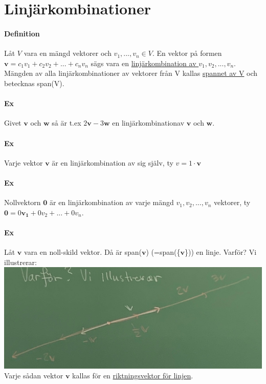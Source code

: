 \section{Linjärkombinationer}
\paragraph{Definition} Låt $V$ vara en mängd vektorer och $v_{1}, ... ,v_{n}\in V$.
En vektor på formen $\bm{v} = c_{1}v_{1}+c_{2}v_{2}+ ... + c_{n}v_{n}$ sägs vara en
\underline{linjärkombination av $v_{1}, v_{2}, ... , v_{n}$}.
Mängden av alla linjärkombinationer av vektorer från V kallas \underline{spannet av V}
och betecknas span(V).

\paragraph{Ex} Givet $\bm{v}$ och $\bm{w}$ så är t.ex $2\bm{v}-3\bm{w}$ en linjärkombinationav $\bm{v}$ och $\bm{w}$.

\paragraph{Ex} Varje vektor $\bm{v}$ är en linjärkombination av sig själv, ty $v=1\cdot \bm{v}$

\paragraph{Ex} Nollvektorn $\bm{0}$ är en linjärkombination av varje mängd $v_{1}, v_{2}, ... , v_{n}$ vektorer,
ty $\bm{0} =  0\bm{v_{1}} + 0v_{2} + ... + 0v_{n}$.

\paragraph{Ex} Låt $\bm{v}$ vara en noll-skild vektor. Då är span($\bm{v}$) (=span(\{$\bm{v}$\})) en linje.
Varför? Vi illustrerar: \\
\includegraphics[scale=0.13]{imgs/22-01-20-img01.jpg}
\\Varje sådan vektor $\bm{v}$ kallas för en \underline{riktningsvektor för linjen}.

